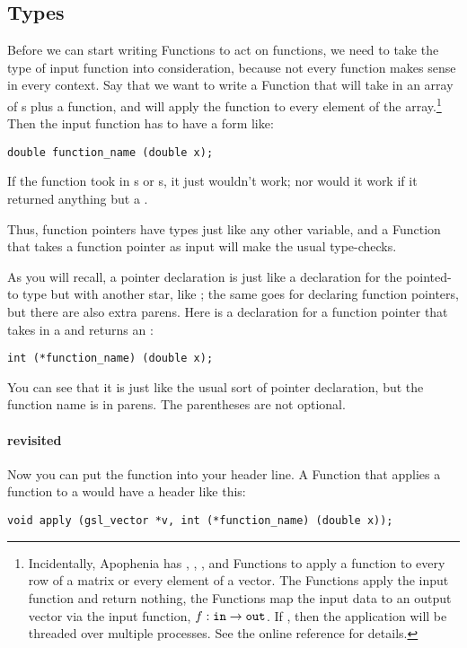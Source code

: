\subsection{Types}\label{apply} Before we can start writing Functions to act on
functions, we need to take the type of input function into
consideration, because not every function makes sense in every context. Say
that we want to write a Function that will take in an array of
s plus a function, and will apply the function to every
element of the array.\footnote{Incidentally, Apophenia has 
, ,
, and  
Functions to apply a function to every row of
a matrix or every element of a vector. The  Functions 
apply the input function and return nothing, the 
Functions map the input data to an output vector via the input function,
$f: {\tt in}\rightarrow {\tt out}$.
If , then the
application will be threaded over multiple processes. See the online
reference for details.}
Then the input function has to have a form like:
\begin{lstlisting}
double function_name (double x);
\end{lstlisting}

If the function took in s or s, it just
wouldn't work; nor would it work if it returned anything but a
.

Thus, function pointers have types just like any other variable, and a
Function that takes a function pointer as input will make the usual
type-checks.

As you will recall, a pointer declaration is just like a declaration for the pointed-to type but with
another star, like ; the same goes for declaring function
pointers, but there are also extra parens. Here is a declaration for a
function pointer that takes in a  and returns an :
\begin{lstlisting}
int (*function_name) (double x);
\end{lstlisting}
You can see that it is just like the usual  sort of pointer
declaration, but the function name is in parens.  The parentheses are not
optional.

\paragraph{ revisited}
Now you can put the function into your header line. A Function that
applies a function to a  would have a header like
this:
\begin{lstlisting}
void apply (gsl_vector *v, int (*function_name) (double x));
\end{lstlisting}

